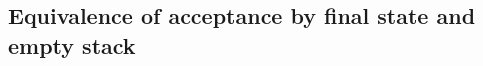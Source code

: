 

\setcounter{section}{6}
\setcounter{subsection}{3}
\setcounter{dfn}{7}

\subsection{Equivalence of acceptance by final state and empty stack}


